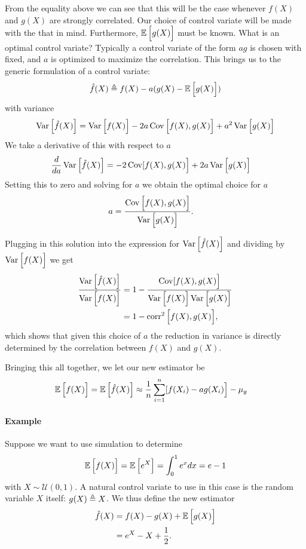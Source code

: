 From the equality above we can see that this will be the case whenever $f(X)$ and $g(X)$ are strongly correlated. Our choice of control variate will be made with the that in mind. Furthermore, $\operatorname{\mathbb{E}} \Big[ g(X) \Big]$ must be known. What is an optimal control variate? Typically a control variate of the form $ag$ is chosen with fixed, and $a$ is optimized to maximize the correlation. This brings us to the generic formulation of a control variate:
\begin{align*}
    \hat{f}(X) \triangleq f(X) - a(g(X) - \operatorname{\mathbb{E}} \Big[ g(X) \Big])
\end{align*}
with variance
\begin{equation*}
  \operatorname{Var} \Big[ \hat{f}(X) \Big] = \operatorname{Var} \Big[ f(X) \Big] - 2a  \operatorname{Cov} \Big[ f(X), g(X) \Big] + a^2 \operatorname{Var} \Big[ g(X) \Big] \\
\end{equation*}
We take a derivative of this with respect to $a$
\begin{align*}
    \frac{d}{d a}\operatorname{Var} \Big[ \hat{f}(X) \Big] &= - 2  \operatorname{Cov} [ f(X), g(X) \Big] + 2a \operatorname{Var} \Big[ g(X) \Big]
\end{align*}
Setting this to zero and solving for $a$ we obtain the optimal choice for $a$
\begin{align}
\label{eq:cv-scale}
  a &= \frac{ \operatorname{Cov} \Big[ f(X), g(X) \Big]}{ \operatorname{Var} \Big[ g(X) \Big]}.
\end{align}

Plugging in this solution into the expression for $\operatorname{Var} \Big[ \hat{f}(X) \Big]$ and dividing by $\operatorname{Var} \Big[ f(X) \Big]$ we get
\begin{align}
\label{eq:var-red}
  \frac{\operatorname{Var} \Big[ \hat{f}(X) \Big]}{\operatorname{Var} \Big[ f(X) \Big]}
    &= 1 - \frac{\operatorname{Cov}[ f(X), g(X) \Big]}{ \operatorname{Var} \Big[ f(X) \Big]  \operatorname{Var} \Big[ g(X) \Big]} \\
    &= 1 - \operatorname{corr}^2 \Big[ f(X), g(X) \Big],
\end{align}
which shows that given this choice of $a$ the reduction in variance is directly determined by the correlation between $f(X)$ and $g(X)$.

Bringing this all together, we let our new estimator be
\begin{align*}
  \operatorname{\mathbb{E}} \Big[ f(X) \Big]
    &= \operatorname{\mathbb{E}} \Big[ \hat{f}(X) \Big] \approx \frac{1}{n} \sum_{i=1}^n [ f(X_i) - ag(X_i) \Big] - \mu_{g}
\end{align*}

\paragraph{Example} \citep{ross2006simulation} Suppose we want to use simulation to determine
\begin{equation*}
    \operatorname{\mathbb{E}} \Big[f(X)\Big] = \operatorname{\mathbb{E}} \Big[e^X\Big] = \int_0^1 e^x dx = e - 1
\end{equation*}
with $X \sim \mathcal{U}(0,1)$. A natural control variate to use in this case is the random variable $X$ itself: $g(X) \triangleq X$. We thus define the new estimator
\begin{align*}
  \hat{f}(X)
    &= f(X) - g(X) + \operatorname{\mathbb{E}} \Big[ g(X) \Big] \\
    &= e^X - X + \frac{1}{2}.
\end{align*}

